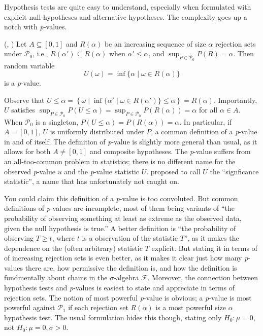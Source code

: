 Hypothesis tests are quite easy to understand, especially when formulated
with explicit null-hypotheses and alternative hypotheses. The complexity
goes up a notch with \emph{p-}values.
\begin{definition}
\label{def:p-value}(\textcite[][Chapter 3.3]{Lehmann2005-sp}, \textcite{Bayarri2000-dt}) Let
$A\subseteq[0,1]$ and $R(\alpha)$ be an increasing sequence of size
$\alpha$ rejection sets under $\mathcal{P}_{0}$, i.e., $R(\alpha')\subseteq R(\alpha)$
when $\alpha'\leq\alpha$, and $\sup_{P\in\mathcal{P}_{0}}P(R)=\alpha$.
Then random variable
\begin{equation}
U(\omega)=\inf\{\alpha\mid\omega\in R(\alpha)\}\label{eq:size p-value}
\end{equation}
is a \emph{p}-value. 
\end{definition}

Observe that $U\leq\alpha=\left\{ \omega\mid\inf\{\alpha'\mid\omega\in R(\alpha')\}\leq\alpha\right\} =R(\alpha)$.
Importantly, $U$ satisfies $\sup_{P\in\mathcal{P}_{0}}P(U\leq\alpha)=\sup_{P\in\mathcal{P}_{0}}P(R(\alpha))=\alpha$
for all $\alpha\in A$. When $\mathcal{P}_{0}$ is a singleton, $P(U\leq\alpha)=P(R(\alpha))=\alpha$.
In particular, if $A=[0,1]$, $U$ is uniformly distributed under
$P$, a common definition of a \emph{p}-value in and of itself. The definition
of \emph{p}-value is slightly more general than usual, as it allows
for both $A\neq[0,1]$ and composite hypotheses. The \emph{p}-value
suffers from an all-too-common problem in statistics; there is no
different name for the observed \emph{p}-value $u$ and the \emph{p}-value
statistic $U$. \textcite{Schweder1988-nh} proposed to call $U$ the
``signficance statistic'', a name that has unfortunately not caught
on. 

You could claim this definition of a \emph{p}-value is too convoluted.
But common definitions of\emph{ p}-values are incomplete, most of
them being variants of ``the probability of observing something at
least as extreme as the observed data, given the null hypothesis is
true.'' A better definition is ``the probability of observing $T\geq t$,
where $t$ is a observation of the statistic $T$'', as it makes
the dependence on the (often arbitrary) statistic $T$ explicit. But
stating it in terms of of increasing rejection sets is even better,
as it makes it clear just how many \emph{p}-values there are, how
permissive the definition is, and how the definition is fundmentally
about chains in the $\sigma$-algebra $\mathcal{F}$. Moreover, the
connection between hypothesis tests and \emph{p}-values is easiest to state
and appreciate in terms of rejection sets. The notion of most powerful
\emph{p}-value is obvious; a \emph{p}-value is most powerful against
$\mathcal{P}_{1}$ if each rejection set $R(\alpha)$ is a most powerful
size $\alpha$ hypothesis test. The usual formulation hides this though, stating only $H_0:\mu = 0$, not $H_0:\mu=0,\sigma>0$.

